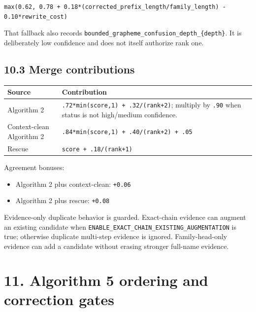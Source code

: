 \begin{verbatim}
max(0.62, 0.78 + 0.18*(corrected_prefix_length/family_length) - 0.10*rewrite_cost)
\end{verbatim}

That fallback also records \texttt{bounded\_\allowbreak{}grapheme\_\allowbreak{}confusion\_\allowbreak{}depth\_\allowbreak{}\{depth\}}. It is deliberately low confidence and does not itself authorize rank one.

\subsection{10.3 Merge contributions}\label{103-merge-contributions}

{\def\LTcaptype{none} %
\begin{longtable}[]{@{}>{\RaggedRight\arraybackslash}p{.27\linewidth}>{\RaggedRight\arraybackslash}p{.66\linewidth}@{}}
\toprule\noalign{}
Source & Contribution \\
\midrule\noalign{}
\endhead
\bottomrule\noalign{}
\endlastfoot
Algorithm 2 & \texttt{.72*min(score,1)\ +\ .32/(rank+2)}; multiply by \texttt{.90} when status is not high/medium confidence. \\
Context-clean Algorithm 2 & \texttt{.84*min(score,1)\ +\ .40/(rank+2)\ +\ .05} \\
Rescue & \texttt{score\ +\ .18/(rank+1)} \\
\end{longtable}
}

Agreement bonuses:

\begin{itemize}
\tightlist
\item
  Algorithm 2 plus context-clean: \texttt{+0.06}
\item
  Algorithm 2 plus rescue: \texttt{+0.08}
\end{itemize}

Evidence-only duplicate behavior is guarded. Exact-chain evidence can augment an existing candidate when \texttt{ENABLE\_\allowbreak{}EXACT\_\allowbreak{}CHAIN\_\allowbreak{}EXISTING\_\allowbreak{}AUGMENTATION} is true; otherwise duplicate multi-step evidence is ignored. Family-head-only evidence can add a candidate without erasing stronger full-name evidence.

\section{11. Algorithm 5 ordering and correction gates}\label{11-algorithm-5-ordering-and-correction-gates}

